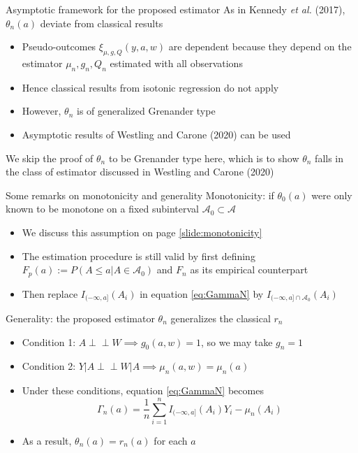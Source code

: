 \documentclass{beamer}
\newcommand{\sn}{\sum_{i=1}^n}
\newcommand{\f}[2]{\frac{#1}{#2}}
\begin{document}
\begin{frame}{Asymptotic framework for the proposed estimator}
  As in Kennedy \textit{et al.} (2017), $\theta_n(a)$ deviate from classical results \\
  \begin{itemize}
    \item Pseudo-outcomes $\xi_{\mu,g,Q}(y,a,w)$ are dependent because they depend on the estimator $\mu_n, g_n, Q_n$ estimated with all observations
    \item Hence classical results from isotonic regression do not apply
    \item However, $\theta_n$ is of generalized Grenander type
    \item Asymptotic results of Westling and Carone (2020) can be used
  \end{itemize}
  We skip the proof of $\theta_n$ to be Grenander type here, which is to show $\theta_n$ falls in the class of estimator discussed in Westling and Carone (2020)
\end{frame}

\begin{frame}{Some remarks on monotonicity and generality} \label{slide:generality}
  Monotonicity: if $\theta_0(a)$ were only known to be monotone on a fixed subinterval $\mathcal{A}_0 \subset \mathcal{A}$
  \begin{itemize}
    \item We discuss this assumption on page \ref{slide:monotonicity}
    \item The estimation procedure is still valid by first defining $F_p(a):=P(A \le a| A \in \mathcal{A}_0)$ and $F_n$ as its empirical counterpart
    \item Then replace $I_{(-\infty,a]}(A_i)$ in equation \ref{eq:GammaN} by $I_{(-\infty,a] \cap \mathcal{A}_0}(A_i)$
  \end{itemize}
  Generality: the proposed estimator $\theta_n$ generalizes the classical $r_n$
  \begin{itemize}
    \item Condition 1: $A \perp \!\!\! \perp W \implies g_0(a,w) = 1$, so we may take $g_n=1$
    \item Condition 2: $Y|A \perp \!\!\! \perp W|A \implies \mu_n(a,w)=\mu_n(a)$
    \item Under these conditions, equation \ref{eq:GammaN} becomes
    $$\Gamma_n(a) = \f{1}{n} \sn I_{(-\infty,a]}(A_i) Y_i -\mu_n(A_i)$$
    \item As a result, $\theta_n(a) = r_n(a)$ for each $a$
  \end{itemize}
\end{frame}
\end{document}
